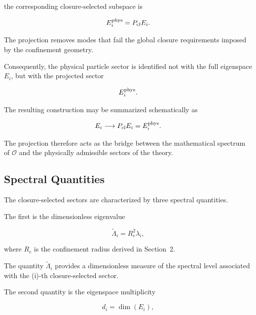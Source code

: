 \documentclass[11pt]{article}
\theoremstyle{definition}
\theoremstyle{remark}
\begin{document}
the corresponding closure-selected subspace is

\begin{equation}
E_i^{\rm phys} = P_{\rm cl}E_i.
\end{equation}

The projection removes modes that fail the global closure
requirements imposed by the confinement geometry.

Consequently, the physical particle sector is identified not
with the full eigenspace \(E_i\), but with the projected sector

\begin{equation}
E_i^{\rm phys}.
\end{equation}

The resulting construction may be summarized schematically as

\begin{equation}
E_i
\longrightarrow
P_{\rm cl}E_i = E_i^{\rm phys}.
\end{equation}

The projection therefore acts as the bridge between the
mathematical spectrum of \(\mathcal O\) and the physically
admissible sectors of the theory.


\subsection{Spectral Quantities}
\label{subsec:spectral_quantities}

The closure-selected sectors are characterized by three
spectral quantities.

The first is the dimensionless eigenvalue

\begin{equation}
\widetilde{\Lambda}_i = R_c^2\lambda_i,
\label{eq:LambdaTilde}
\end{equation}

where \(R_c\) is the confinement radius derived in
Section~2.

The quantity \(\widetilde{\Lambda}_i\) provides a
dimensionless measure of the spectral level associated with the
(i)-th closure-selected sector.

The second quantity is the eigenspace multiplicity

\begin{equation}
d_i = 
\dim(E_i),
\label{eq:di}
\end{equation}
\end{document}
